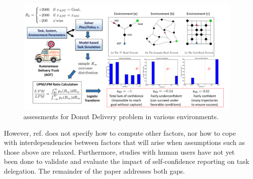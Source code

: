     \begin{figure}[tbp]
        \centering
        \includegraphics[width=0.7\linewidth]{Figures/xO_FullADT.png}
        \caption{\xO{} assessments for Donut Delivery problem in various environments.}
        \label{fig:xOexample}
    \end{figure}



However, ref. \cite{Aitken2016-cv} does not specify how to compute other factors, nor how to cope with interdependencies between factors that will arise when assumptions such as those above are relaxed. Furthermore, studies with human users have not yet been done to validate and evaluate the impact of self-confidence reporting on task delegation. The remainder of the paper addresses both gaps. 
